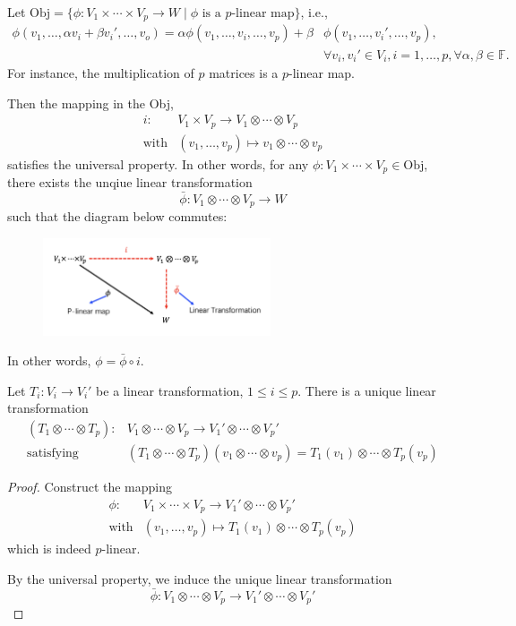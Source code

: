 \begin{theorem}
Let $\text{Obj}=\{\phi:V_1\times\cdots\times V_p\to W\mid\phi\text{ is a $p$-linear map}\}$, i.e.,
\begin{align*}
\phi(v_1,\dots,\alpha v_i+\beta v_i',\dots,v_o)
=
\alpha\phi(v_1,\dots,v_i,\dots,v_p)
+
\beta&\phi(v_1,\dots,v_i',\dots,v_p),\\
&\forall v_i,v_i'\in V_i,
i=1,\dots,p,
\forall\alpha,\beta\in\mathbb{F}.
\end{align*}
For instance, the multiplication of $p$ matrices is a $p$-linear map.

Then the mapping in the Obj, 
\[
\begin{array}{ll}
i:&V_1\times V_p\to V_1\otimes\cdots\otimes V_p\\
\text{with}&(v_1,\dots,v_p)\mapsto v_1\otimes \cdots\otimes v_p
\end{array}
\]
satisfies the universal property.
In other words, for any $\phi:V_1\times \cdots\times V_p\in\text{Obj}$, 
there exists the unqiue linear transformation 
\[
\bar{\phi}:V_1\otimes\cdots\otimes V_p\to W
\]
such that the diagram below commutes:
\begin{figure}[H]
\centering
\includegraphics[width=0.6\textwidth]{week14/f_20}
\end{figure}
In other words, $\phi=\bar{\phi}\circ i$.
\end{theorem}

\begin{corollary}
Let $T_i:V_i\to V_i'$ be a linear transformation, $1\le i\le p$.
There is a unique linear transformation
\[
\begin{array}{ll}
(T_1\otimes\cdots\otimes T_p):&V_1\otimes\cdots\otimes V_p\to V_1'\otimes\cdots\otimes V_p'\\
\text{satisfying}&(T_1\otimes\cdots\otimes T_p)(v_1\otimes\cdots\otimes v_p)
=
T_1(v_1)\otimes\cdots\otimes T_p(v_p)
\end{array}
\]
\end{corollary}
\begin{proof}
Construct the mapping
\[
\begin{array}{ll}
\phi:&V_1\times\cdots\times V_p\to V_1'\otimes\cdots\otimes V_p'\\
\text{with}&(v_1,\dots,v_p)\mapsto T_1(v_1)\otimes\cdots\otimes T_p(v_p)
\end{array}
\]
which is indeed $p$-linear.

By the universal property, we induce the unique linear transformation
\[
\bar{\phi}:V_1\otimes\cdots\otimes V_p\to V_1'\otimes\cdots\otimes V_p'
\]
\end{proof}
